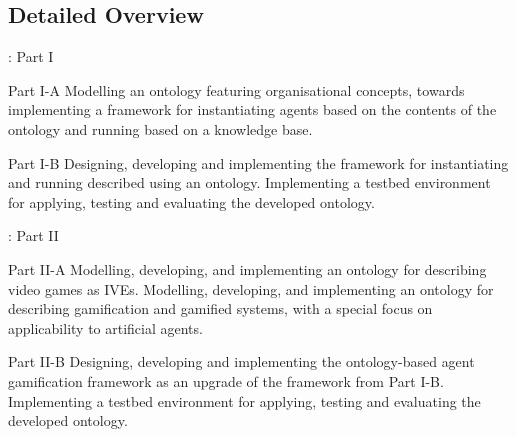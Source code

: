 \subsection{Detailed Overview}

\begin{frame}{\insertsection: Part \RN{1}}

    \onslide<+->
    \begin{exampleblock}{Part \RN{1}-A}
        Modelling an \alert{ontology} featuring organisational concepts, towards implementing a framework for \alert{instantiating agents} based on the contents of the ontology \alert{and running } based on a knowledge base.
    \end{exampleblock}

    \onslide<+->
    \begin{exampleblock}{Part \RN{1}-B}
        Designing, developing and implementing the \alert{framework for instantiating} and running  described using an ontology. Implementing a \alert{testbed environment} for applying, testing and evaluating the developed ontology.
    \end{exampleblock}
    
\end{frame}

\begin{frame}{\insertsection: Part \RN{2}}

    \onslide<+->
    \begin{exampleblock}{Part \RN{2}-A}
        Modelling, developing, and implementing \alert{an ontology for describing video games} as \acfp{IVE}. Modelling, developing, and implementing \alert{an ontology for describing gamification} and gamified systems, with a special focus on applicability to artificial agents.
    \end{exampleblock}

    \onslide<+->
    \begin{exampleblock}{Part \RN{2}-B}
        Designing, developing and implementing the ontology-based \alert{agent gamification framework} as an upgrade of the framework from Part \RN{1}-B. Implementing a \alert{testbed environment} for applying, testing and evaluating the developed ontology.
    \end{exampleblock}
    
\end{frame}